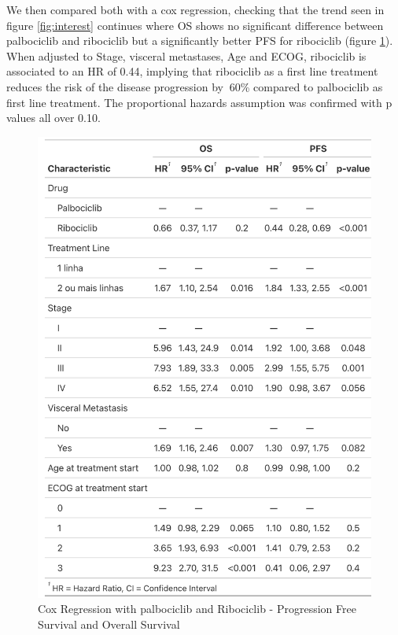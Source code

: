 We then compared both with a cox regression, checking that the trend seen in figure  \ref{fig:interest} continues where OS shows no significant difference between palbociclib and ribociclib but a significantly better PFS for ribociclib (figure \ref*{fig:cox}). When adjusted to Stage, visceral metastases, Age and ECOG, ribociclib is associated to an HR of 0.44, implying that ribociclib as a first line treatment reduces the risk of the disease progression by $~$60\% compared to palbociclib as first line treatment. The proportional hazards assumption was confirmed with p values all over 0.10.
\begin{figure}[ht]
  \centering
  \caption{Cox Regression with palbociclib and Ribociclib - Progression Free Survival and Overall Survival}\label{fig:cox} 
  \includegraphics[scale=0.25]{figures/cox_both.png}%

\end{figure}

